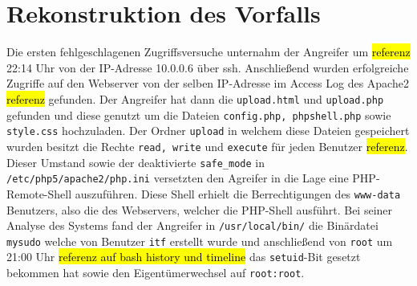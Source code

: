 \section{Rekonstruktion des Vorfalls}
Die ersten fehlgeschlagenen Zugriffsversuche unternahm der Angreifer um \hl{referenz} 22:14 Uhr von der IP-Adresse 10.0.0.6 über ssh.
Anschließend wurden erfolgreiche Zugriffe auf den Webserver von der selben IP-Adresse im Access Log des Apache2 \hl{referenz} gefunden.
Der Angreifer hat dann die \texttt{upload.html} und \texttt{upload.php} gefunden und diese genutzt um die Dateien \texttt{config.php, phpshell.php} sowie \texttt{style.css} hochzuladen. Der Ordner \texttt{upload} in welchem diese Dateien gespeichert wurden besitzt die Rechte \texttt{read, write} und \texttt{execute} für jeden Benutzer \hl{referenz}. 
Dieser Umstand sowie der deaktivierte \texttt{safe\_mode} in \texttt{/etc/php5/apache2/php.ini} versetzten den Agreifer in die Lage eine PHP-Remote-Shell auszuführen.
Diese Shell erhielt die Berrechtigungen des \texttt{www-data} Benutzers, also die des Webservers, welcher die PHP-Shell ausführt.
Bei seiner Analyse des Systems fand der Angreifer in \texttt{/usr/local/bin/} die Binärdatei \texttt{mysudo} welche von Benutzer \texttt{itf} erstellt wurde und anschließend von \texttt{root} um 21:00 Uhr \hl{referenz auf bash history und timeline} das \texttt{setuid}-Bit gesetzt bekommen hat sowie den Eigentümerwechsel auf \texttt{root:root}.
